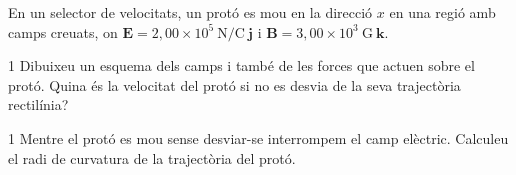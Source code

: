 En un selector de velocitats, un protó es mou en la direcció $x$ en una regió amb camps creuats, on $\boldsymbol{E} = 2,00\times 10^{5}\ \mathrm{N/C}\ \boldsymbol{j}$ i $\boldsymbol{B} = 3,00\times 10^{3}\ \mathrm{G}\ \boldsymbol{k}$.

\begin{apartat}{1}
Dibuixeu un esquema dels camps i també de les forces que actuen sobre el protó. Quina és la velocitat del protó si no es desvia de la seva trajectòria rectilínia?
\end{apartat}

\begin{apartat}{1}
Mentre el protó es mou sense desviar-se interrompem el camp elèctric. Calculeu el radi de curvatura de la trajectòria del protó.
\end{apartat}

